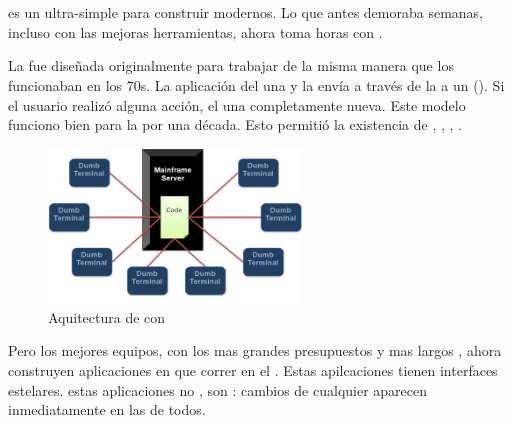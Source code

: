
\chapter{\meteor}\label{cap:chapter_meteor}


\meteor es un \environment ultra-simple para construir \websites modernos. Lo que antes demoraba semanas, incluso con las mejoras herramientas, ahora toma horas con \meteor.

La \web fue diseñada originalmente para trabajar de la misma manera que los \mainframes funcionaban en los 70s. La aplicación del \serverAS \rendered una \screen y la envía a través de la \network a un \dumbterminal (). Si el usuario realizó alguna acción, el \serverAS \rendered una \screen completamente nueva. Este modelo funciono bien para la \web por una década. Esto permitió la existencia de \lamp, \rails, \django, \phpNAME.

\begin{figure}[h!]
	\centering
	\includegraphics[width=0.6\textwidth]{figuras/mainframeServer_dumbterminal.png}
	\caption{Aquitectura de \mainframe con \dumbterminal}
	\label{figure:mainframeServer_dumbterminal}
\end{figure}


Pero los mejores equipos, con los mas grandes presupuestos y mas largos \schedules, ahora construyen aplicaciones en \javaScriptNAME que correr en el \clientAS. Estas apilcaciones tienen interfaces estelares. estas aplicaciones no \reload \pages, son \reactive: cambios de cualquier \clientAS aparecen inmediatamente en las \screen de todos.

